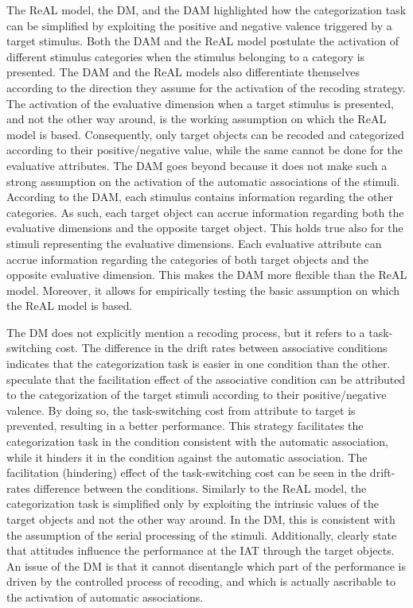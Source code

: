 \documentclass[12pt]{book}
\begin{document}
The ReAL model, the DM, and the DAM highlighted how the categorization task can be simplified by exploiting the positive and negative valence triggered by a target stimulus. 
Both the DAM and the ReAL model postulate the activation of different stimulus categories when the stimulus belonging to a category is presented. 
The DAM and the ReAL models also differentiate themselves according to the direction they assume for the activation of the recoding strategy. 
The activation of the evaluative dimension when a target stimulus is presented, and not the other way around, is the working assumption on which the ReAL model is based. Consequently, only target objects  can be recoded and categorized according to their positive/negative value, while the same cannot be done for the evaluative attributes. 
The DAM goes beyond because it does not make such a strong assumption on the activation of the automatic associations of the stimuli. 
According to the DAM, each stimulus contains information regarding the other categories. As such, each target object can accrue information regarding both the evaluative dimensions and the opposite target object. This holds true also for the stimuli representing the evaluative dimensions. Each evaluative attribute can accrue information regarding the categories of both target objects and the opposite evaluative dimension. This makes the DAM more flexible than the ReAL model. Moreover, it allows for empirically testing the basic assumption on which the ReAL model is based.

The DM does not explicitly mention a recoding process, but it refers to a task-switching cost. The difference in the drift rates between associative conditions indicates that the categorization task is easier in one condition than the other.  speculate that the facilitation effect of the associative condition can be attributed to the categorization of the target stimuli according to their positive/negative valence. By doing so, the task-switching cost from attribute to target is prevented, resulting in a better performance. This strategy facilitates the categorization task in the condition consistent with the automatic association, while it hinders it in the condition against the automatic association. 
The facilitation (hindering) effect of the task-switching cost can be seen in the  drift-rates difference between the conditions. 
Similarly to the ReAL model, the categorization task is simplified only by exploiting the intrinsic values of the target objects and not the other way around. In the DM, this is consistent with the assumption of the serial processing of the stimuli. Additionally,  clearly state that attitudes influence the performance at the IAT through the target objects. 
An issue of the DM is that it cannot disentangle which part of the performance is driven by the controlled process of recoding, and which is actually ascribable to the  activation of automatic associations.
\end{document}
